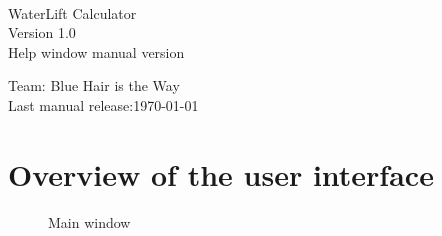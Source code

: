 \documentclass[a5paper, 11pt]{article}
\begin{document}
\begin{titlepage}
    \begin{center}
        \,
        
        \Huge
        WaterLift Calculator\\
    
        \LARGE
        Version 1.0\\
        \large
        Help window manual version
        
        \Large
        Team:               \hfill Blue Hair is the Way\\
        Last manual release:\hfill \today\\
    \end{center}
\end{titlepage}

\tableofcontents

\pagebreak

\section{Overview of the user interface}
    \begin{figure}[h]
        \centering
        \caption{Main window}
        \label{pic:UI_Main_Window_01}
    \end{figure}

\pagebreak
\end{document}
